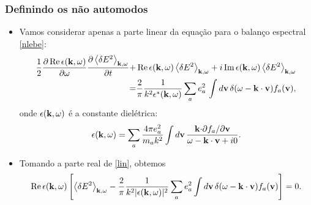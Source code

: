 \documentclass[10pt,aspectratio=1610,lualatex]{beamer}
\begin{document}

\begin{frame}
  \frametitle{Definindo os não automodos}
  \begin{itemize}
    \item Vamos considerar apenas a parte linear da equação
    para o balanço espectral \eqref{nlebe}:
    \begin{equation}
      \label{lin}
      \begin{split}
	\frac{1}{2}\frac{\partial\,\mbox{Re}\,
	  \epsilon({\bf k},\omega)}{\partial \omega}
	\frac{\partial \left<\delta E^2\right>_{{\bf k},\omega}}{\partial t}
	+&\,\mbox{Re}\,\epsilon({\bf k},\omega)
	\left< \delta E^2 \right>_{{\bf k},\omega}
	+i\,\mbox{Im}\,\epsilon({\bf k},\omega)
	\left< \delta E^2 \right>_{{\bf k},\omega}\\
	=&\frac{2}{\pi}\frac{1}{k^2\epsilon^{*}({\bf k},\omega)}
	\sum_a e^2_a\, \int d{\bf v}\,
	\delta(\omega-{\bf k \cdot v})f_a({\bf v}),
      \end{split}
    \end{equation}
    onde $\epsilon({\bf k},\omega)$ é a constante dielétrica:
    \begin{equation}
      \label{dielec}
      \epsilon({\bf k},\omega)=\sum_a \frac{4\pi e^2_a}{m_ak^2}\int d{\bf v}\,
      \frac{{\bf k \cdot}\partial f_a/\partial{\bf v}}{\omega-{\bf k \cdot v}+i0}.
    \end{equation}
    \pause
    \item Tomando a parte real de \eqref{lin}, obtemos
    \begin{equation}
      \label{real}
      \mbox{Re}\, \epsilon({\bf k},\omega)\left[
      \left\langle \delta E^2 \right\rangle_{{\bf k},\omega}
      -\frac{2}{\pi}\frac{1}{k^2|\epsilon({\bf k},\omega)|^2}
      \sum_a e_a^2 \int d{\bf v}\, \delta(\omega-{\bf k \cdot v})
      f_a({\bf v})\right]=0.
    \end{equation}
  \end{itemize}
\end{frame}
\end{document}
